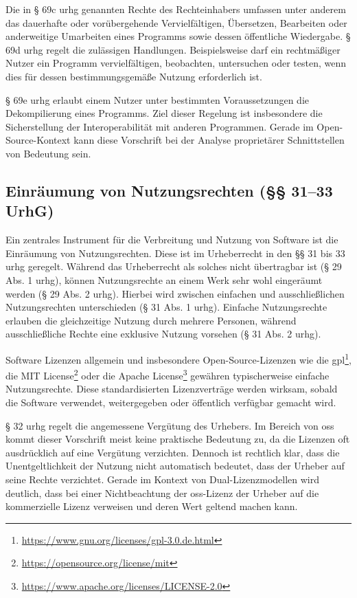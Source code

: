 Die in § 69c \gls{urhg} genannten Rechte des Rechteinhabers umfassen unter anderem das dauerhafte oder vorübergehende Vervielfältigen, Übersetzen, Bearbeiten oder anderweitige Umarbeiten eines Programms sowie dessen öffentliche Wiedergabe.
§ 69d \gls{urhg} regelt die zulässigen Handlungen.
Beispielsweise darf ein rechtmäßiger Nutzer ein Programm vervielfältigen, beobachten, untersuchen oder testen, wenn dies für dessen bestimmungsgemäße Nutzung erforderlich ist.

§ 69e \gls{urhg} erlaubt einem Nutzer unter bestimmten Voraussetzungen die Dekompilierung eines Programms.
Ziel dieser Regelung ist insbesondere die Sicherstellung der Interoperabilität mit anderen Programmen.
Gerade im Open-Source-Kontext kann diese Vorschrift bei der Analyse proprietärer Schnittstellen von Bedeutung sein.


\subsection{Einräumung von Nutzungsrechten (§§ 31–33 UrhG)}

Ein zentrales Instrument für die Verbreitung und Nutzung von Software ist die Einräumung von Nutzungsrechten.
Diese ist im Urheberrecht in den §§ 31 bis 33 \gls{urhg} geregelt.
Während das Urheberrecht als solches nicht übertragbar ist (§ 29 Abs. 1 \gls{urhg}), können Nutzungsrechte an einem Werk sehr wohl eingeräumt werden (§ 29 Abs. 2 \gls{urhg}).
Hierbei wird zwischen einfachen und ausschließlichen Nutzungsrechten unterschieden (§ 31 Abs. 1 \gls{urhg}).
Einfache Nutzungsrechte erlauben die gleichzeitige Nutzung durch mehrere Personen, während ausschließliche Rechte eine exklusive Nutzung vorsehen (§ 31 Abs. 2 \gls{urhg}).

Software Lizenzen allgemein und insbesondere Open-Source-Lizenzen wie die \gls{gpl}\footnote{\url{https://www.gnu.org/licenses/gpl-3.0.de.html}}, die MIT License\footnote{\url{https://opensource.org/license/mit}} oder die Apache
License\footnote{\url{https://www.apache.org/licenses/LICENSE-2.0}} gewähren typischerweise einfache Nutzungsrechte.
Diese standardisierten Lizenzverträge werden wirksam, sobald die Software verwendet, weitergegeben oder öffentlich verfügbar gemacht wird.

§ 32 \gls{urhg} regelt die angemessene Vergütung des Urhebers.
Im Bereich von \gls{oss} kommt dieser Vorschrift meist keine praktische Bedeutung zu, da die Lizenzen oft ausdrücklich auf eine Vergütung verzichten.
Dennoch ist rechtlich klar, dass die Unentgeltlichkeit der Nutzung nicht automatisch bedeutet, dass der Urheber auf seine Rechte verzichtet.
Gerade im Kontext von Dual-Lizenzmodellen wird deutlich, dass bei einer Nichtbeachtung der \gls{oss}-Lizenz der Urheber auf die kommerzielle Lizenz verweisen und deren Wert geltend machen kann.

